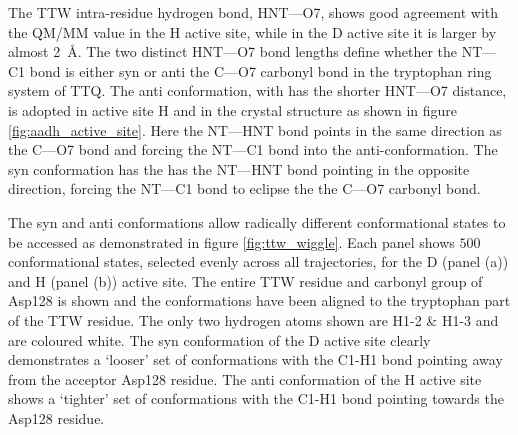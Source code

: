 The TTW intra-residue hydrogen bond, HNT---O7, shows good agreement with the QM/MM value in the H active site, while in the D active site it is larger by almost \SI{2}{\angstrom}. The two distinct HNT---O7 bond lengths define whether the NT---C1 bond is either syn or anti the C---O7 carbonyl bond in the tryptophan ring system of TTQ. The anti conformation, with has the shorter HNT---O7 distance, is adopted in active site H and in the crystal structure as shown in figure \ref{fig:aadh_active_site}.  Here the NT---HNT bond points in the same direction as the C---O7 bond and forcing the NT---C1 bond into the anti-conformation. The syn conformation has the has the NT---HNT bond pointing in the opposite direction, forcing the NT---C1 bond to eclipse the the C---O7 carbonyl bond. 

The syn and anti conformations allow radically different conformational states to be accessed as demonstrated in figure \ref{fig:ttw_wiggle}. Each panel shows $500$ conformational states, selected evenly across all trajectories, for the D (panel (a)) and H (panel (b)) active site. The entire TTW residue and carbonyl group of Asp128 is shown and the conformations have been aligned to the tryptophan part of the TTW residue. The only two hydrogen atoms shown are H1-2 \& H1-3 and are coloured white. The syn conformation of the D active site clearly demonstrates a `looser' set of conformations with the  C1-H1 bond pointing away from the acceptor Asp128 residue. The anti conformation of the H active site shows a `tighter' set of conformations with the C1-H1 bond pointing towards the Asp128 residue. 


